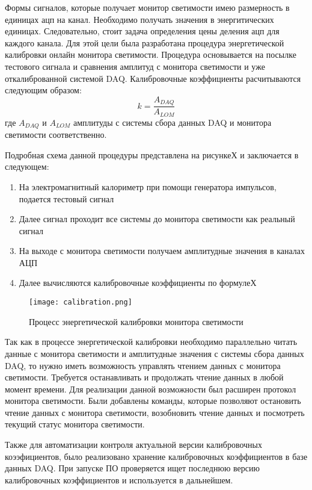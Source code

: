   Формы сигналов, которые получает монитор светимости имею размерность в единицах ацп на канал. Необходимо получать значения в энергитических единицах. Следовательно, стоит задача определения цены деления ацп для каждого канала. Для этой цели была разработана процедура энергетической калибровки онлайн монитора светимости. Процедура основывается на посылке тестового сигнала и сравнения амплитуд с монитора светимости и уже откалиброванной системой DAQ. Калибровочные коэффициенты расчитываются следующим образом:
\begin{equation}
  k = \frac{A_{DAQ}}{A_{LOM}}
\end{equation}
 где $A_{DAQ}$ и $A_{LOM}$ амплитуды с системы сбора данных DAQ и монитора светимости соответственно.\par
  Подробная схема данной процедуры представлена на рисункеХ и заключается в следующем:
\begin{enumerate}
  \item На электромагнитный калориметр при помощи генератора импульсов, подается тестовый сигнал
  \item Далее сигнал проходит все системы до монитора светимости как реальный сигнал
  \item На выходе с монитора светимости получаем амплитудные значения в каналах АЦП
  \item Далее вычисляются калибровочные коэффициенты по формулеХ
\end{enumerate}\par
\begin{figure}[htp]
  \centering
  \texttt{[image: calibration.png]}
  \caption{Процесс энергетической калибровки монитора светимости}
  \label{fig:galaxy}
\end{figure}
  Так как в процессе энергетической калибровки необходимо параллельно читать данные с монитора светимости и амплитудные значения с системы сбора данных DAQ, то нужно иметь возможность управлять чтением данных с монитора светимости. Требуется останавливать и продолжать чтение данных в любой момент времени. Для реализации данной возможности был расширен протокол монитора светимости. Были добавлены команды, которые позволяют остановить чтение данных с монитора светимости, возобновить чтение данных и посмотреть текущий статус монитора светимости.\par
  Также для автоматизации контроля актуальной версии калибровочных коээфициентов, было реализовано хранение калибровочных коэффициентов в базе данных DAQ. При запуске ПО  проверяется ищет последнюю версию калибровочных коэффициентов и используется в дальнейшем.\par
